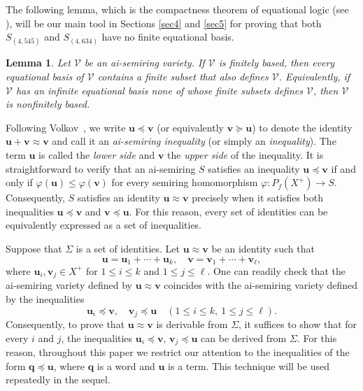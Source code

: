 \documentclass[reqno]{amsart}
\theoremstyle{plain}
\newtheorem{lem}[thm]{Lemma}
\theoremstyle{definition}
\newcommand{\bq}{\mathbf{q}}
\newcommand{\bu}{\mathbf{u}}
\newcommand{\bv}{\mathbf{v}}
\begin{document}
The following lemma, which is the compactness theorem of equational logic (see \cite[Exercise II.14.10]{bs}),
will be our main tool in Sections \ref{sec4} and \ref{sec5} for proving that both $S_{(4, 545)}$ and $S_{(4, 634)}$ have no finite equational basis.
\begin{lem}\label{el26012701}
Let $\mathcal{V}$ be an ai-semiring variety.
If $\mathcal{V}$ is finitely based,
then every equational basis of $\mathcal{V}$ contains a finite subset that also defines $\mathcal{V}$.
Equivalently, if $\mathcal{V}$ has an infinite equational basis none of whose finite subsets defines $\mathcal{V}$,
then $\mathcal{V}$ is nonfinitely based.
\end{lem}

Following Volkov~\cite{volkov2024},
we write $\bu \preceq \bv$ (or equivalently $\bv \succeq \bu$) to denote the identity $\bu+\bv \approx \bv$
and call it an \emph{ai-semiring inequality} (or simply an \emph{inequality}).
The term $\mathbf{u}$ is called the \emph{lower side} and $\mathbf{v}$ the \emph{upper side} of the inequality.
It is straightforward to verify that an ai-semiring $S$ satisfies an inequality $\bu\preceq \bv$
if and only if $\varphi(\bu)\leq\varphi(\bv)$ for every semiring homomorphism $\varphi\colon P_f(X^+) \rightarrow S$.
Consequently, $S$ satisfies an identity $\bu\approx \bv$
precisely when it satisfies both inequalities $\bu\preceq\bv$ and $\bv\preceq\bu$.
For this reason, every set of identities can be equivalently expressed as a set of inequalities.

Suppose that $\Sigma$ is a set of identities.
Let $\mathbf{u}\approx \mathbf{v}$ be an identity such that
\[
\mathbf{u}=\mathbf{u}_1+\cdots+\mathbf{u}_k,\quad \mathbf{v}=\mathbf{v}_1+\cdots+\mathbf{v}_\ell,
\]
where $\mathbf{u}_i,\mathbf{v}_j\in X^+$ for $1\leq i\leq k$ and $1\leq j\leq \ell$.
One can readily check that the ai-semiring variety defined by $\mathbf{u}\approx \mathbf{v}$
coincides with the ai-semiring variety defined by the inequalities
\[
\mathbf{u}_i\preceq \mathbf{v}, \quad \mathbf{v}_j\preceq \mathbf{u}\quad(1\leq i\leq k, ~1\leq j\leq \ell).
\]
Consequently, to prove that $\mathbf{u}\approx \mathbf{v}$ is derivable from $\Sigma$,
it suffices to show that for every $i$ and $j$,
the inequalities
$\mathbf{u}_i\preceq \mathbf{v}$, $\mathbf{v}_j\preceq \mathbf{u}$
can be derived from $\Sigma$.
For this reason, throughout this paper we restrict our attention to the inequalities of the form $\bq\preceq\bu$,
where $\bq$ is a word and $\bu$ is a term.
This technique will be used repeatedly in the sequel.
\end{document}
